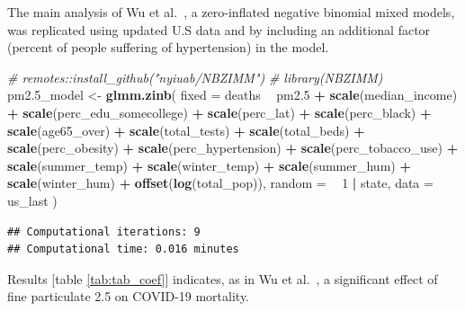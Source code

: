 \documentclass[12pt,halfline,a4paper,]{ouparticle}
\newenvironment{Shaded}{\begin{snugshade}}{\end{snugshade}}
\newcommand{\CommentTok}[1]{\textcolor[rgb]{0.56,0.35,0.01}{\textit{#1}}}
\newcommand{\DataTypeTok}[1]{\textcolor[rgb]{0.13,0.29,0.53}{#1}}
\newcommand{\DecValTok}[1]{\textcolor[rgb]{0.00,0.00,0.81}{#1}}
\newcommand{\FloatTok}[1]{\textcolor[rgb]{0.00,0.00,0.81}{#1}}
\newcommand{\KeywordTok}[1]{\textcolor[rgb]{0.13,0.29,0.53}{\textbf{#1}}}
\newcommand{\NormalTok}[1]{#1}
\newcommand{\OperatorTok}[1]{\textcolor[rgb]{0.81,0.36,0.00}{\textbf{#1}}}
\newcommand{\StringTok}[1]{\textcolor[rgb]{0.31,0.60,0.02}{#1}}
\begin{document}
The main analysis of Wu et al.~\citeyearpar{wu2020m}, a zero-inflated
negative binomial mixed models, was replicated using updated U.S data
and by including an additional factor (percent of people suffering of
hypertension) in the model.

\begin{Shaded}
\begin{Highlighting}[]
\CommentTok{# remotes::install_github("nyiuab/NBZIMM")}
\CommentTok{# library(NBZIMM)}
\NormalTok{pm2}\FloatTok{.5}\NormalTok{_model <-}\StringTok{ }\KeywordTok{glmm.zinb}\NormalTok{(}
  \DataTypeTok{fixed =}
\NormalTok{    deaths }\OperatorTok{~}
\StringTok{    }\NormalTok{pm2}\FloatTok{.5} \OperatorTok{+}
\StringTok{      }\KeywordTok{scale}\NormalTok{(median_income) }\OperatorTok{+}
\StringTok{      }\KeywordTok{scale}\NormalTok{(perc_edu_somecollege) }\OperatorTok{+}
\StringTok{      }\KeywordTok{scale}\NormalTok{(perc_lat) }\OperatorTok{+}
\StringTok{      }\KeywordTok{scale}\NormalTok{(perc_black) }\OperatorTok{+}
\StringTok{      }\KeywordTok{scale}\NormalTok{(age65_over) }\OperatorTok{+}
\StringTok{      }\KeywordTok{scale}\NormalTok{(total_tests) }\OperatorTok{+}
\StringTok{      }\KeywordTok{scale}\NormalTok{(total_beds) }\OperatorTok{+}
\StringTok{      }\KeywordTok{scale}\NormalTok{(perc_obesity) }\OperatorTok{+}
\StringTok{      }\KeywordTok{scale}\NormalTok{(perc_hypertension) }\OperatorTok{+}
\StringTok{      }\KeywordTok{scale}\NormalTok{(perc_tobacco_use) }\OperatorTok{+}
\StringTok{      }\KeywordTok{scale}\NormalTok{(summer_temp) }\OperatorTok{+}
\StringTok{      }\KeywordTok{scale}\NormalTok{(winter_temp) }\OperatorTok{+}
\StringTok{      }\KeywordTok{scale}\NormalTok{(summer_hum) }\OperatorTok{+}
\StringTok{      }\KeywordTok{scale}\NormalTok{(winter_hum) }\OperatorTok{+}
\StringTok{      }\KeywordTok{offset}\NormalTok{(}\KeywordTok{log}\NormalTok{(total_pop)),}
  \DataTypeTok{random =} \OperatorTok{~}\StringTok{ }\DecValTok{1} \OperatorTok{|}\StringTok{ }\NormalTok{state,}
  \DataTypeTok{data =}\NormalTok{ us_last}
\NormalTok{)}
\end{Highlighting}
\end{Shaded}

\begin{verbatim}
## Computational iterations: 9 
## Computational time: 0.016 minutes
\end{verbatim}

Results {[}table \ref{tab:tab_coef}{]} indicates, as in Wu et
al.~\citeyearpar{wu2020m}, a significant effect of fine particulate 2.5
on COVID-19 mortality.
\end{document}
